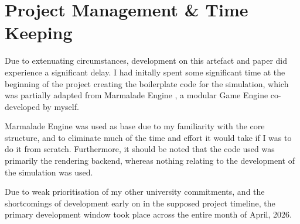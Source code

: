 \chapter{Project Management \& Time Keeping}

Due to extenuating circumstances, development on this artefact and paper did experience a significant delay.
I had initally spent some significant time at the beginning of the project creating the boilerplate code for the simulation,
which was partially adapted from Marmalade Engine \autocite{MarmaladeEngineMarmalade2026}, a modular Game Engine co-developed by myself.

Marmalade Engine was used as base due to my familiarity with the core structure, and to eliminate much of the time and effort it would take if I was to do it from scratch.
Furthermore, it should be noted that the code used was primarily the rendering backend, whereas nothing relating to the development of the simulation was used.

Due to weak prioritisation of my other university commitments, and the shortcomings of development early on in the supposed project timeline, the primary development window took place across the entire month of April, 2026.

